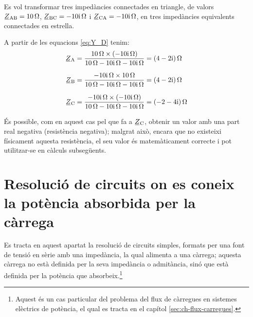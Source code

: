 	
\begin{exemple}\label{ex:TriangleEstrella}
	\addcontentsxms{\TriangleEstrella}
    Es vol transformar tres impedàncies connectades en triangle, de
    valors $ \cmplx{Z}\ped{AB}=\qty{10}{\ohm}$,
    $\cmplx{Z}\ped{BC}=\complexqty{-j10}{\ohm}$ i
    $\cmplx{Z}\ped{CA}=\complexqty{-j10}{\ohm}$, en tres impedàncies
    equivalents connectades en estrella.

    A partir de les equacions \eqref{eq:Y_D}  tenim:
    \begin{align*}
       \cmplx{Z}\ped{A} & = \frac{\qty{10}{\ohm}\times(\complexqty{-j10}{\ohm})}{\qty{10}{\ohm} - \complexqty{j10}{\ohm} - \complexqty{j10}{\ohm}} = \complexqty{4-j2}{\ohm} \\[1.5ex]
       \cmplx{Z}\ped{B} & = \frac{\complexqty{-j10}{\ohm}\times \qty{10}{\ohm}}{\qty{10}{\ohm} - \complexqty{j10}{\ohm} - \complexqty{j10}{\ohm}} = \complexqty{4-j2}{\ohm} \\[1.5ex]
    \cmplx{Z}\ped{C} &= \frac{\complexqty{-j10}{\ohm}\times(\complexqty{-j10}{\ohm})}{\qty{10}{\ohm} -
    \complexqty{j10}{\ohm} - \complexqty{j10}{\ohm}} = \complexqty{-2-j4}{\ohm}
    \end{align*}

    És possible, com en aquest cas pel que fa a $\cmplx{Z}\ped{C}$,
    obtenir un valor amb una part real negativa (resistència negativa);
    malgrat això, encara que no existeixi físicament aquesta resistència,
    el seu valor és matemàticament correcte i  pot utilitzar-se en
    càlculs subsegüents.
\end{exemple}



\section{Resolució de circuits on es coneix la potència absorbida per la
càrrega}\label{sec:EZS}

Es tracta en aquest apartat la resolució de circuits simples,
formats per una font de tensió en sèrie amb una impedància, la qual
alimenta a una càrrega; aquesta càrrega no està definida per la seva
impedància o admitància, sinó que està definida per la potència que absorbeix.\footnote{Aquest és un cas particular del problema del flux de càrregues en sistemes elèctrics de potència, el qual es tracta en el capítol \ref{sec:ch-flux-carregues}.}

